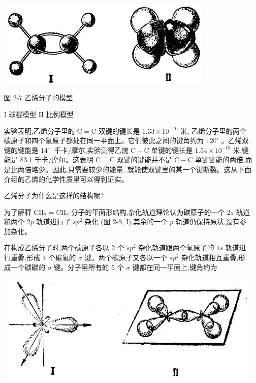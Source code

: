 \documentclass[10pt]{article}
\begin{document}
\begin{center}
\includegraphics[max width=0.8\textwidth]{images/01912d16-be99-77bb-9535-4f3ed8d9946f_68_783608.jpg}
\end{center}

图 2-7 乙烯分子的模型

I 球棍模型 II 比例模型

实验表明,乙烯分子里的 \(\mathrm{C} = \mathrm{C}\) 双键的键长是 \({1.33} \times {10}^{-{10}}\) 米, 乙烯分子里的两个碳原子和四个氢原子都处在同一平面上。它们彼此之间的键角约为 \({120}^{ \circ }\) 。乙烯双键的键能是 \({14}^{ - }\) 千卡/摩尔,实验测得乙烷 \(\mathrm{C} - \mathrm{C}\) 单键的键长是 \({1.54} \times {10}^{-{10}}\) 米,键能是 83.1 千卡/摩尔。这表明 \(\mathrm{C} = \mathrm{C}\) 双键的键能并不是 \(\mathrm{C} - \mathrm{C}\) 单键键能的两倍,而是比两倍略少。因此,只需要较少的能量, 就能使双键里的某一个键断裂。这从下面介绍的乙烯的化学性质里可以得到证实。

乙烯分子为什么是这样的结构呢?

为了解释 \({\mathrm{{CH}}}_{2} = {\mathrm{{CH}}}_{2}\) 分子的平面形结构,杂化轨道理论认为碳原子的一个 \({2s}\) 轨道和两个 \({2p}\) 轨道进行了 \(s{p}^{2}\) 杂化 (图 2-8, I),其余的一个 \(p\) 轨道仍保持原状,没有参加杂化。

在构成乙烯分子时,两个碳原子各以 2 个 \(s{p}^{2}\) 杂化轨道跟两个氢原子的 \({1s}\) 轨道进行重叠,形成 4 个碳氢的 \(\sigma\) 键。两个碳原子又各以一个 \(s{p}^{2}\) 杂化轨道相互重叠,形成一个碳碳的 \(\sigma\) 键。分子里所有的 5 个 \(\sigma\) 键都在同一平面上,键角约为

\begin{center}
\includegraphics[max width=1.0\textwidth]{images/01912d16-be99-77bb-9535-4f3ed8d9946f_69_604475.jpg}
\end{center}
\end{document}

